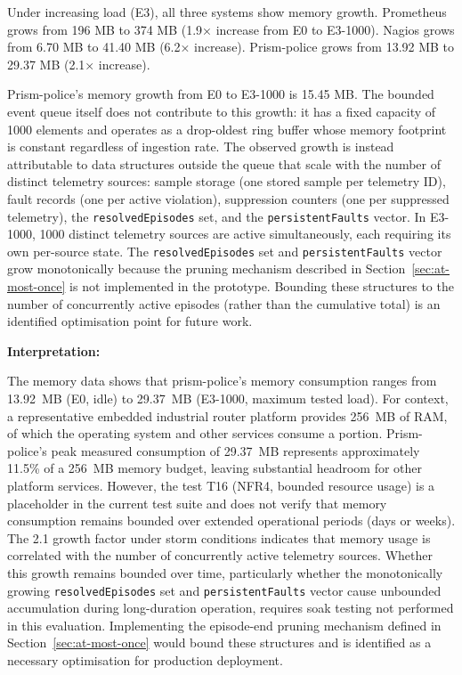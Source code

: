Under increasing load (E3), all three systems show memory growth. Prometheus grows from 196 MB to 374 MB (1.9× increase from E0 to E3-1000). Nagios grows from 6.70 MB to 41.40 MB (6.2× increase). Prism-police grows from 13.92 MB to 29.37 MB (2.1× increase).

Prism-police's memory growth from E0 to E3-1000 is 15.45 MB. The bounded event queue itself does not contribute to this growth: it has a fixed capacity of 1000 elements and operates as a drop-oldest ring buffer whose memory footprint is constant regardless of ingestion rate. The observed growth is instead attributable to data structures outside the queue that scale with the number of distinct telemetry sources: sample storage (one stored sample per telemetry ID), fault records (one per active violation), suppression counters (one per suppressed telemetry), the \texttt{resolvedEpisodes} set, and the \texttt{persistentFaults} vector. In E3-1000, 1000 distinct telemetry sources are active simultaneously, each requiring its own per-source state. The \texttt{resolvedEpisodes} set and \texttt{persistentFaults} vector grow monotonically because the pruning mechanism described in Section~\ref{sec:at-most-once} is not implemented in the prototype. Bounding these structures to the number of concurrently active episodes (rather than the cumulative total) is an identified optimisation point for future work.

\textbf{Interpretation:}

The memory data shows that prism-police's memory consumption ranges from 13.92~MB (E0, idle) to 29.37~MB (E3-1000, maximum tested load). For context, a representative embedded industrial router platform provides 256~MB of RAM, of which the operating system and other services consume a portion. Prism-police's peak measured consumption of 29.37~MB represents approximately 11.5\% of a 256~MB memory budget, leaving substantial headroom for other platform services. However, the test T16 (NFR4, bounded resource usage) is a placeholder in the current test suite and does not verify that memory consumption remains bounded over extended operational periods (days or weeks). The 2.1\texttimes{} growth factor under storm conditions indicates that memory usage is correlated with the number of concurrently active telemetry sources. Whether this growth remains bounded over time, particularly whether the monotonically growing \texttt{resolvedEpisodes} set and \texttt{persistentFaults} vector cause unbounded accumulation during long-duration operation, requires soak testing not performed in this evaluation. Implementing the episode-end pruning mechanism defined in Section~\ref{sec:at-most-once} would bound these structures and is identified as a necessary optimisation for production deployment.

